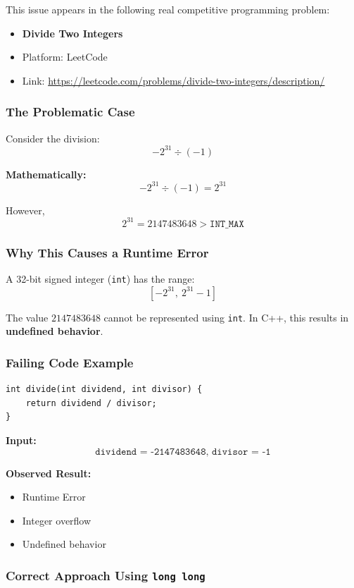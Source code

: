 \documentclass[11pt]{article}
\begin{document}
This issue appears in the following real competitive programming problem:

\begin{itemize}
    \item \textbf{Divide Two Integers}
    \item Platform: LeetCode
    \item Link: \url{https://leetcode.com/problems/divide-two-integers/description/}
\end{itemize}

\subsubsection{The Problematic Case}

Consider the division:
\[
-2^{31} \div (-1)
\]

\textbf{Mathematically:}
\[
-2^{31} \div (-1) = 2^{31}
\]

However,
\[
2^{31} = 2147483648 > \texttt{INT\_MAX}
\]

\subsubsection{Why This Causes a Runtime Error}

A 32-bit signed integer (\texttt{int}) has the range:
\[
[-2^{31},\ 2^{31}-1]
\]

The value $2147483648$ cannot be represented using \texttt{int}.  
In C++, this results in \textbf{undefined behavior}.

\subsubsection{Failing Code Example}

\begin{lstlisting}
int divide(int dividend, int divisor) {
    return dividend / divisor;
}
\end{lstlisting}

\textbf{Input:}
\[
\texttt{dividend = -2147483648,\ divisor = -1}
\]

\textbf{Observed Result:}
\begin{itemize}
    \item Runtime Error
    \item Integer overflow
    \item Undefined behavior
\end{itemize}

\subsubsection{Correct Approach Using \texttt{long long}}
\end{document}
